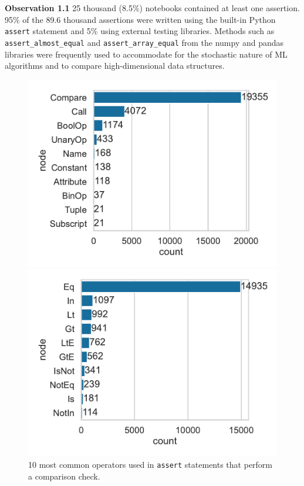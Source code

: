 \documentclass[smallextended]{svjour3}       %
\newcommand{\highlight}[1]{\begin{framed}%
  \noindent#1
\end{framed}}
\begin{document}
\highlight{\textbf{Observation 1.1} 25 thousand (8.5\%) notebooks contained at least one assertion. 95\% of the 89.6 thousand assertions were written using the built-in Python \lstinline{assert} statement and 5\% using external testing libraries. Methods such as \lstinline{assert_almost_equal} and \lstinline{assert_array_equal} from the numpy and pandas libraries were frequently used to accommodate for the stochastic nature of ML algorithms and to compare high-dimensional data structures.}

\begin{figure}
	\centering
	\begin{minipage}{0.49\textwidth}
		\centering
		\includegraphics[width=\linewidth]{common-assert-test.pdf}
		\caption{10 most common AST nodes in the test attribute of \lstinline{assert} statements.}
		\label{fig:common-assert-test}
	\end{minipage}
	\hfill
	\begin{minipage}{0.49\textwidth}
		\centering
		\includegraphics[width=\linewidth]{common-compare-op.pdf}
		\caption{10 most common operators used in \lstinline{assert} statements that perform a comparison check.}
		\label{fig:common-compare-op}
	\end{minipage}
\end{figure}
\end{document}
